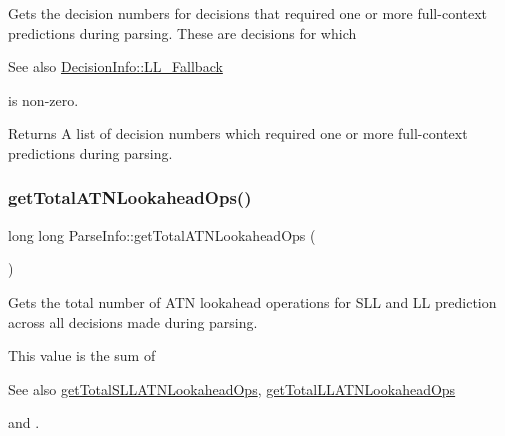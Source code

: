 Gets the decision numbers for decisions that required one or more full-\/context predictions during parsing. These are decisions for which \begin{DoxySeeAlso}{See also}
\hyperlink{classantlr4_1_1atn_1_1DecisionInfo_a311fb2f2a4f7c6108106b8700f03cb18}{Decision\+Info\+::\+L\+L\+\_\+\+Fallback}


\end{DoxySeeAlso}
is non-\/zero. 

\begin{DoxyReturn}{Returns}
A list of decision numbers which required one or more full-\/context predictions during parsing. 
\end{DoxyReturn}
\mbox{\label{classantlr4_1_1atn_1_1ParseInfo_ad96f64c07f563177909d856a40f420fe}} 
\subsubsection{\texorpdfstring{get\+Total\+A\+T\+N\+Lookahead\+Ops()}{getTotalATNLookaheadOps()}}
{\footnotesize\ttfamily long long Parse\+Info\+::get\+Total\+A\+T\+N\+Lookahead\+Ops (\begin{DoxyParamCaption}{ }\end{DoxyParamCaption})\hspace{0.3cm}{\ttfamily [virtual]}}



Gets the total number of A\+TN lookahead operations for S\+LL and LL prediction across all decisions made during parsing. 

This value is the sum of \begin{DoxySeeAlso}{See also}
\hyperlink{classantlr4_1_1atn_1_1ParseInfo_a0d67b72cf3de480e3b2142711568129e}{get\+Total\+S\+L\+L\+A\+T\+N\+Lookahead\+Ops}, \hyperlink{classantlr4_1_1atn_1_1ParseInfo_aa99c2df168f4fe0673b6ae24900a33d9}{get\+Total\+L\+L\+A\+T\+N\+Lookahead\+Ops}


\end{DoxySeeAlso}
and .\mbox{\label{classantlr4_1_1atn_1_1ParseInfo_aa99c2df168f4fe0673b6ae24900a33d9}} 
